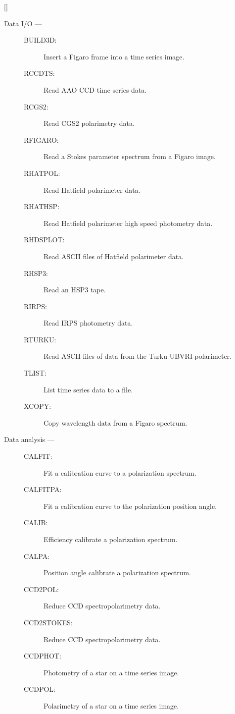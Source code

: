 \vspace{-10mm}

\hfill []

\vspace{2mm}

\begin{description}
\item [Data I/O ---]
\begin{description}
\item [BUILD3D:]  Insert a Figaro frame into a time series image.
\item [RCCDTS:]  Read AAO CCD time series data.
\item [RCGS2:]  Read CGS2 polarimetry data.
\item [RFIGARO:]  Read a Stokes parameter spectrum from a Figaro image.
\item [RHATPOL:]  Read Hatfield polarimeter data.
\item [RHATHSP:]  Read Hatfield polarimeter high speed photometry data.
\item [RHDSPLOT:]  Read ASCII files of Hatfield polarimeter data.
\item [RHSP3:]  Read an HSP3 tape.
\item [RIRPS:]  Read IRPS photometry data.
\item [RTURKU:]  Read ASCII files of data from the Turku UBVRI polarimeter.
\item [TLIST:]  List time series data to a file.
\item [XCOPY:]  Copy wavelength data from a Figaro spectrum.
\end{description}
\item [Data analysis ---]
\begin{description}
\item [CALFIT:]  Fit a calibration curve to a polarization spectrum.
\item [CALFITPA:]  Fit a calibration curve to the polarization position angle.
\item [CALIB:]  Efficiency calibrate a polarization spectrum.
\item [CALPA:]  Position angle calibrate a polarization spectrum.
\item [CCD2POL:]  Reduce CCD spectropolarimetry data.
\item [CCD2STOKES:]  Reduce CCD spectropolarimetry data.
\item [CCDPHOT:]  Photometry of a star on a time series image.
\item [CCDPOL:]  Polarimetry of a star on a time series image.

\end{description}
\end{description}
